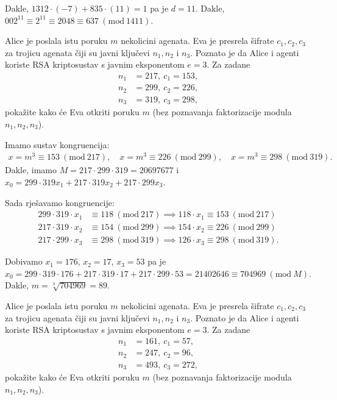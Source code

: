 \documentclass{exam}
\newcommand{\Mod}[1]{\ (\mathrm{mod}\ #1)}
\begin{document}
\begin{questions}
\begin{solution}
  Dakle, $1312 \cdot (-7) + 835 \cdot (11) = 1$ pa je $d = 11$. Dakle, $002^{11} \equiv 2^{11} \equiv 2048 \equiv 637 \Mod{1411}$.
\end{solution}

\question Alice je poslala istu poruku $m$ nekolicini agenata. Eva je presrela šifrate $c_1, c_2, c_3$ za trojicu agenata čiji su javni ključevi $n_1, n_2$ i $n_3$. Poznato je da Alice i agenti koriste RSA kriptosustav s javnim eksponentom $e = 3$. Za zadane
\begin{align*}
  n_1 &= 217, \ c_1 = 153, \\
  n_2 &= 299, \ c_2 = 226, \\
  n_3 &= 319, \ c_3 = 298,
\end{align*}
pokažite kako će Eva otkriti poruku $m$ (bez poznavanja faktorizacije modula $n_1, n_2, n_3$).

\begin{solution}
  Imamo sustav kongruencija:
  \begin{align*}
    x = m^3 \equiv 153 \Mod{217}, \quad x = m^3 \equiv 226 \Mod{299}, \quad x = m^3 \equiv 298 \Mod{319}.
  \end{align*}
  Dakle, imamo $M = 217 \cdot 299 \cdot 319 = 20697677$ i $x_0 = 299 \cdot 319 x_1 + 217 \cdot 319 x_2 + 217 \cdot 299 x_3$.

  Sada rješavamo kongruencije:
  \begin{align*}
    299 \cdot 319 \cdot x_1 &\equiv 118 \Mod{217} \implies 118 \cdot x_1 \equiv 153 \Mod{217}\\
    217 \cdot 319 \cdot x_2 &\equiv 154 \Mod{299} \implies 154 \cdot x_2 \equiv 226 \Mod{299}\\
    217 \cdot 299 \cdot x_3 &\equiv 298 \Mod{319} \implies 126 \cdot x_3 \equiv 298 \Mod{319}.
  \end{align*}

  Dobivamo $x_1 = 176$, $x_2 = 17$, $x_3 = 53$ pa je $x_0 = 299 \cdot 319 \cdot 176 + 217 \cdot 319 \cdot 17 + 217 \cdot 299 \cdot 53 = 21402646 \equiv 704969 \Mod{M}$. Dakle, $m = \sqrt[3]{704969} = 89$.
\end{solution}

\pagebreak

\question Alice je poslala istu poruku $m$ nekolicini agenata. Eva je presrela šifrate $c_1, c_2, c_3$ za trojicu agenata čiji su javni ključevi $n_1, n_2$ i $n_3$. Poznato je da Alice i agenti koriste RSA kriptosustav s javnim eksponentom $e = 3$. Za zadane
\begin{align*}
  n_1 &= 161, \ c_1 = 57, \\
  n_2 &= 247, \ c_2 = 96, \\
  n_3 &= 493, \ c_3 = 272,
\end{align*}
pokažite kako će Eva otkriti poruku $m$ (bez poznavanja faktorizacije modula $n_1, n_2, n_3$).


\end{questions}
\end{document}

